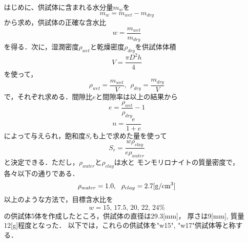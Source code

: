はじめに、供試体に含まれる水分量$m_w$を
\begin{equation}
	m_w=m_{wet}-m_{dry}
	\label{eqn:}
\end{equation}
から求め，供試体の正確な含水比
\begin{equation}
	w=\frac{m_{wet}}{m_{dry}}
	\label{eqn:water_content}
\end{equation}
を得る．次に，湿潤密度$\rho_{wet}$と乾燥密度$\rho_{dry}$を供試体体積
\begin{equation}
	V=\frac{\pi D^2h}{4}
	\label{eqn:}
\end{equation}
を使って，
\begin{equation}
	\rho_{wet}=\frac{m_{wet}}{V}, \ \ 
	\rho_{dry}=\frac{m_{dry}}{V}
	\label{eqn:}
\end{equation}
で，それぞれ求める．間隙比$e$と間隙率は以上の結果から
\begin{equation}
	e=\frac{\rho_{wet}}{\rho_{dry}} -1
	\label{eqn:}
\end{equation}
\begin{equation}
	n=\frac{e}{1+e}
	\label{eqn:}
\end{equation}
によって与えられ，飽和度$S_r$も上で求めた量を使って
\begin{equation}
	S_r=\frac{w\rho_{clay}}{e\rho_{water}}
	\label{eqn:}
\end{equation}
と決定できる．ただし，$\rho_{water}$と$\rho_{clay}$は水と
モンモリロナイトの質量密度で，各々以下の通りである．
\begin{equation}
	\rho_{water}=1.0, \ \ \rho_{clay}=2.7 {\rm [g/cm^3]}
	\label{eqn:}
\end{equation}
以上のような方法で，目標含水比を
\[
	w=15,\, 17.5,\, 20,\, 22,\, 24\%
\]
の供試体5体を作成したところ，供試体の直径は29.3[mm]，
厚さは9[mm], 質量12[g]程度となった．
以下では，これらの供試体を"w15", "w17"供試体等と称する．
